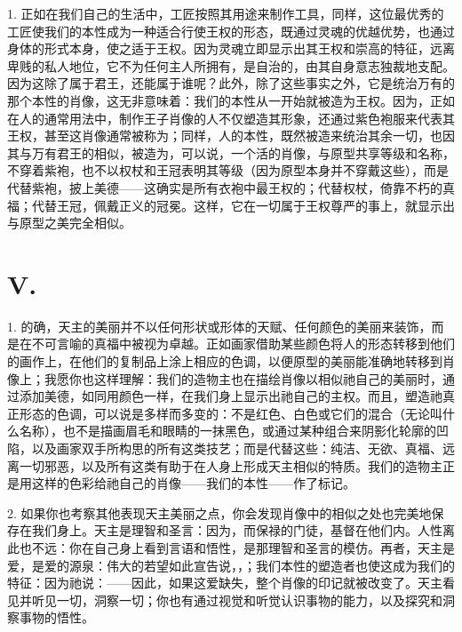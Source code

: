 1. 正如在我们自己的生活中，工匠按照其用途来制作工具，同样，这位最优秀的工匠使我们的本性成为一种适合行使王权的形态，既通过灵魂的优越优势，也通过身体的形式本身，使之适于王权。因为灵魂立即显示出其王权和崇高的特征，远离卑贱的私人地位，它不为任何主人所拥有，是自治的，由其自身意志独裁地支配。因为这除了属于君王，还能属于谁呢？此外，除了这些事实之外，它是统治万有的那个本性的肖像，这无非意味着：我们的本性从一开始就被造为王权。因为，正如在人的通常用法中，制作王子肖像的人不仅塑造其形象，还通过紫色袍服来代表其王权，甚至这肖像通常被称为；同样，人的本性，既然被造来统治其余一切，也因其与万有君王的相似，被造为，可以说，一个活的肖像，与原型共享等级和名称，不穿着紫袍，也不以权杖和王冠表明其等级（因为原型本身并不穿戴这些），而是代替紫袍，披上美德——这确实是所有衣袍中最王权的；代替权杖，倚靠不朽的真福；代替王冠，佩戴正义的冠冕。这样，它在一切属于王权尊严的事上，就显示出与原型之美完全相似。\par


\section{V. }

1. 的确，天主的美丽并不以任何形状或形体的天赋、任何颜色的美丽来装饰，而是在不可言喻的真福中被视为卓越。正如画家借助某些颜色将人的形态转移到他们的画作上，在他们的复制品上涂上相应的色调，以便原型的美丽能准确地转移到肖像上；我愿你也这样理解：我们的造物主也在描绘肖像以相似祂自己的美丽时，通过添加美德，如同用颜色一样，在我们身上显示出祂自己的主权。而且，塑造祂真正形态的色调，可以说是多样而多变的：不是红色、白色或它们的混合（无论叫什么名称），也不是描画眉毛和眼睛的一抹黑色，或通过某种组合来阴影化轮廓的凹陷，以及画家双手所构思的所有这类技艺；而是代替这些：纯洁、无欲、真福、远离一切邪恶，以及所有这类有助于在人身上形成天主相似的特质。我们的造物主正是用这样的色彩给祂自己的肖像——我们的本性——作了标记。\par

2. 如果你也考察其他表现天主美丽之点，你会发现肖像中的相似之处也完美地保存在我们身上。天主是理智和圣言：因为，而保禄的门徒，基督在他们内。人性离此也不远：你在自己身上看到言语和悟性，是那理智和圣言的模仿。再者，天主是爱，是爱的源泉：伟大的若望如此宣告说，，；我们本性的塑造者也使这成为我们的特征：因为祂说：——因此，如果这爱缺失，整个肖像的印记就被改变了。天主看见并听见一切，洞察一切；你也有通过视觉和听觉认识事物的能力，以及探究和洞察事物的悟性。\par

